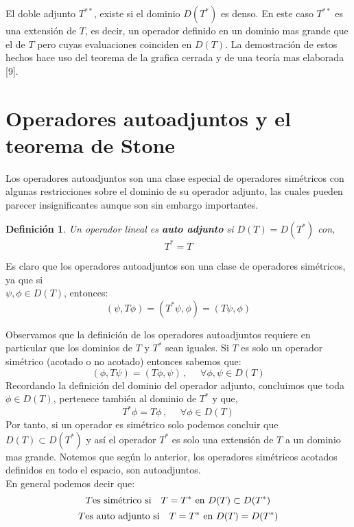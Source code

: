 \documentclass[12pt]{book}
\numberwithin{equation}{chapter}
\newtheorem{definition}[theorem]{Definici\'on}
\def\n{\noindent}
\begin{document}
El doble adjunto $T^{* *}$, existe si el dominio $D(T^{*})$ es denso. En este caso $T^{* *}$ es una extensi\'on de $T$, es decir, un operador definido en un dominio mas grande que el de $T$ pero cuyas evaluaciones coinciden en $D(T)$. La demostraci\'on de estos hechos hace uso del teorema de la grafica cerrada y de una teor\'ia mas elaborada [9].

\newpage

\section{Operadores autoadjuntos y el teorema de Stone}
Los operadores autoadjuntos son una clase especial de operadores sim\'etricos con algunas restricciones sobre el dominio de su operador adjunto, las cuales pueden parecer insignificantes aunque son sin embargo importantes.

\begin{definition}
Un operador lineal es {\bf auto adjunto} si $D(T)=D(T^{*})$ con,
\begin{equation}
T^{*}= T
\end{equation}
\end{definition}
\n Es claro que los operadores autoadjuntos son una clase de operadores sim\'etricos, ya que si\\ 
$\psi ,\phi \in D(T)$, entonces:
$$ ( \psi ,T\phi )=(T^{*} \psi , \phi)=(T\psi , \phi) $$
\rightline{$\dag$}
\vspace{2 mm}

Observamos que la definici\'on de los operadores autoadjuntos requiere en particular que los dominios de $T$ y $T^{*}$ sean iguales. Si $T$ es solo un operador sim\'etrico (acotado o no acotado) entonces sabemos que:
\begin{equation}
(\phi , T\psi )=( T\phi ,\psi )\,,\,\,\,\,\,\,\,\, \forall \phi , \psi \in D(T)
\end{equation}
Recordando la definici\'on del dominio del operador adjunto, concluimos que toda $\phi \in D(T)$, pertenece tambi\'en al dominio de $T^{*}$ y que,
\begin{equation}
T^{*} \phi = T \phi \,,\,\,\,\,\,\,\,\, \forall \phi \in D(T) 
\end{equation}
Por tanto, si un operador es sim\'etrico solo podemos concluir que $ D(T) \subset D(T^{*}) $ y as\'i el operador $T^{*}$ es solo una extensi\'on de $T$ a un dominio mas grande. Notemos que seg\'un lo anterior, los operadores sim\'etricos acotados definidos en todo el espacio, son autoadjuntos.\\
En general podemos decir que:
\begin{equation}
T \hbox{es sim\'etrico si }\,\,\,\, T=T^{*} \hbox{ en } D(T) \subset D(T^{*}) 
\end{equation}
\begin{equation}
T \hbox{es auto adjunto si }\,\,\,\, T=T^{*} \hbox{ en } D(T) = D(T^{*}) 
\end{equation}
\end{document}
